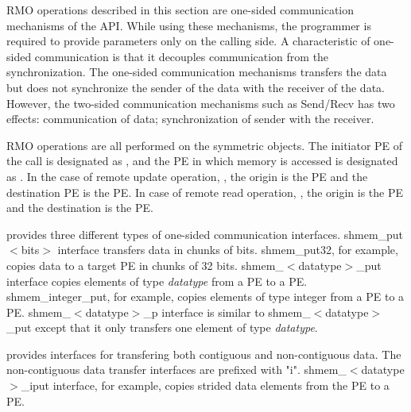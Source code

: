 \ac{RMO} operations described in this section are one-sided communication
mechanisms of the \openshmem{} \ac{API}. While 
using these mechanisms, the programmer is required to provide parameters
only on the calling side. A characteristic of one-sided communication 
is that it decouples communication from
the synchronization. The one-sided communication mechanisms transfers 
the data but does not synchronize the sender of the data with the receiver
of the data. However, the two-sided communication mechanisms such as Send/Recv has two effects: 
communication of data; synchronization of sender with the receiver.

\openshmem{} \ac{RMO} operations are all performed on the symmetric objects. 
The initiator \ac{PE} of the call is designated as \source{}, and the 
\ac{PE} in which memory is accessed is designated as \target{}. In the case of remote
update operation, \PUT{}, the origin is the \source{} \ac{PE} and the 
destination \ac{PE} is the \target{} PE. In case of remote read operation, \GET{}, 
the origin is the \target{} \ac{PE} and the destination is the \source{} \ac{PE}.

\openshmem{} provides three different types of one-sided communication interfaces. 
shmem\_put$<$bits$>$ interface transfers data in chunks 
of bits. shmem\_put32, for example, copies data to a target \ac{PE} in chunks of 
32 bits. shmem\_$<$datatype$>$\_put interface copies elements of type 
\textit{datatype} from a \source{} \ac{PE} to a \target{} \ac{PE}. 
shmem\_integer\_put, for example, copies elements
of type integer from a \source{} \ac{PE} to a \target{} \ac{PE}. 
shmem\_$<$datatype$>$\_p interface is similar to shmem\_$<$datatype$>$\_put 
except that it only transfers one element of type \textit{datatype}.

\openshmem{} provides interfaces for transfering both contiguous and 
non-contiguous data. The non-contiguous data transfer interfaces are prefixed 
with "i". shmem\_$<$datatype$>$\_iput interface, for example, copies strided
data elements from the \source{} \ac{PE} to a \target{} \ac{PE}. 


